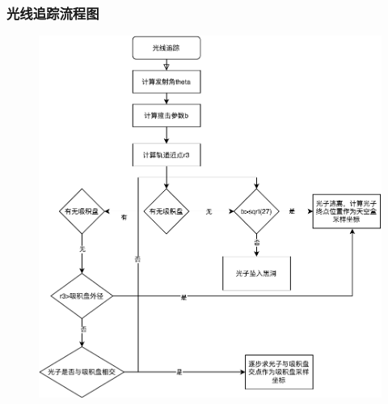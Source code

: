 \documentclass{beamer}
\begin{document}
\begin{frame}
    \frametitle{光线追踪流程图}
    \begin{figure}[H]
        \centering
        \includegraphics[scale=0.45]{images/flowchart.pdf}
    \end{figure}
\end{frame}
\end{document}
